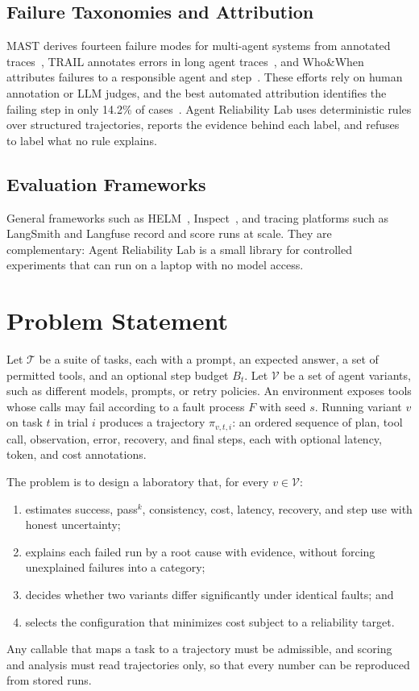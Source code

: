 \documentclass[conference,a4paper]{IEEEtran}
\begin{document}
\subsection{Failure Taxonomies and Attribution}
MAST derives fourteen failure modes for multi-agent systems from annotated
traces~\cite{cemri2025mast}, TRAIL annotates errors in long agent
traces~\cite{deshpande2025trail}, and Who\&When attributes failures to a responsible
agent and step~\cite{zhang2025whowhen}. These efforts rely on human annotation or LLM
judges, and the best automated attribution identifies the failing step in only 14.2\%
of cases~\cite{zhang2025whowhen}. Agent Reliability Lab uses deterministic rules over
structured trajectories, reports the evidence behind each label, and refuses to label
what no rule explains.

\subsection{Evaluation Frameworks}
General frameworks such as HELM~\cite{liang2023helm}, Inspect~\cite{inspect2024}, and
tracing platforms such as LangSmith and Langfuse record and score runs at scale.
They are complementary: Agent Reliability Lab is a small library for controlled
experiments that can run on a laptop with no model access.

\section{Problem Statement}

Let $\mathcal{T}$ be a suite of tasks, each with a prompt, an expected answer, a set of
permitted tools, and an optional step budget $B_t$. Let $\mathcal{V}$ be a set of agent
variants, such as different models, prompts, or retry policies. An environment exposes
tools whose calls may fail according to a fault process $F$ with seed $s$. Running
variant $v$ on task $t$ in trial $i$ produces a trajectory $\pi_{v,t,i}$: an ordered
sequence of plan, tool call, observation, error, recovery, and final steps, each with
optional latency, token, and cost annotations.

The problem is to design a laboratory that, for every $v \in \mathcal{V}$:
\begin{enumerate}
\item estimates success, pass$^k$, consistency, cost, latency, recovery, and step use
with honest uncertainty;
\item explains each failed run by a root cause with evidence, without forcing
unexplained failures into a category;
\item decides whether two variants differ significantly under identical faults; and
\item selects the configuration that minimizes cost subject to a reliability target.
\end{enumerate}
Any callable that maps a task to a trajectory must be admissible, and scoring and
analysis must read trajectories only, so that every number can be reproduced from
stored runs.
\end{document}

